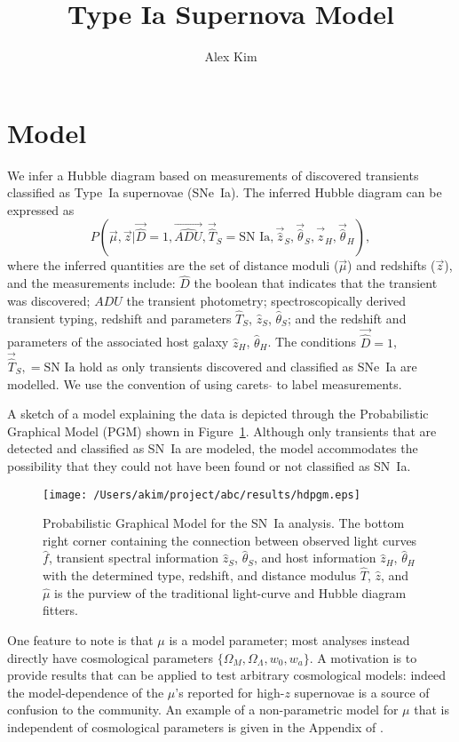 \documentclass[preprint]{aastex}
\begin{document}
\title{Type Ia Supernova Model}
\author{Alex Kim}

\section{Model}
We infer a Hubble diagram based on measurements of discovered transients
classified as Type~Ia supernovae (SNe~Ia).  The inferred Hubble diagram can be
expressed as
\begin{equation}
P(\vec{\mu},\vec{z}| \vec{\hat{D}}=1, \vec{\hat{ADU}}, \vec{\hat{T}}_S=\text{SN~Ia},\vec{\hat{z}}_S,
\vec{\hat{\theta}}_S,\vec{\hat{z}}_H,\vec{\hat{\theta}}_H),
\label{hd:eqn}
\end{equation}
where the inferred quantities are the set of distance moduli ($\vec{\mu}$)
and redshifts ($\vec{z}$), and 
the measurements include: $\hat{D}$ the boolean that indicates that
the transient was discovered; $\hat{ADU}$ the transient photometry;
spectroscopically derived transient
typing, redshift and parameters $\hat{T}_S$, $\hat{z}_S$, $\hat{\theta}_S$;
and the redshift and parameters of the associated host galaxy $\hat{z}_{H}$, $\hat{\theta}_H$.
The conditions $\vec{\hat{D}}=1$, $\vec{\hat{T}}_S,=\text{SN~Ia}$ hold as only transients
discovered and classified as SNe~Ia are modelled.  We use the convention of using carets $\hat{}$
to  label measurements. 

A sketch of a model explaining the data is depicted through the Probabilistic Graphical Model
(PGM)
shown in Figure~\ref{pgm:fig}.
Although only transients that are detected and classified as
SN~Ia are modeled, the model accommodates the possibility that they could not have been found
or not classified as SN~Ia.

\begin{figure}[htbp] %
   \centering
   \texttt{[image: /Users/akim/project/abc/results/hdpgm.eps]} 
   \caption{Probabilistic Graphical Model for the SN~Ia analysis.
   The bottom right corner containing the connection between observed light curves
   $\hat{f}$, transient spectral information $\hat{z}_S$, $\hat{\theta}_S$, and
   host information $\hat{z}_H$, $\hat{\theta}_H$ with the determined type, redshift, and distance
   modulus $\hat{T}$, $\hat{z}$, and $\hat{\mu}$ is the purview of
   the traditional light-curve and Hubble diagram fitters.
   \label{pgm:fig}}
\end{figure}

One feature to note is that $\mu$ is a model parameter; most analyses instead
directly have cosmological parameters $\{\Omega_M, \Omega_\Lambda, w_0, w_a\}$.
A motivation is to provide results that can be applied to test arbitrary cosmological models:
indeed the model-dependence of the $\mu$'s reported for high-$z$ supernovae 
\citep[e.g.][]{2012ApJ...746...85S} is a source of confusion to the community.
An example of a non-parametric model for $\mu$ that is independent of cosmological
parameters is given in the Appendix of
\citet{2013ApJ...764..116W}.
\end{document}
